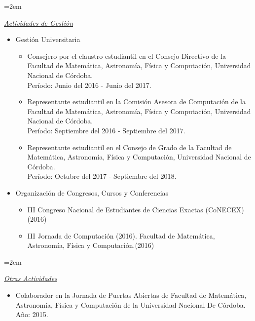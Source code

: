 \documentclass[paper=a4,fontsize=11pt]{scrartcl} %
\newlength{\spacebox}
\newcommand{\PersonalEntry}[2]{
		\noindent\hangindent=2em\hangafter=0 %
		\parbox{\spacebox}{        %
		\textit{#1}}		       %
		\hspace{1.5em} #2 \par}    %
\newcommand{\SkillsEntry}[2]{      %
		\noindent\hangindent=2em\hangafter=0 %
		\parbox{\spacebox}{        %
		\textit{#1}}			   %
		\hspace{1.5em} #2 \par}    %
\begin{document}
\SkillsEntry{\underline{Actividades de Gestión}} {
\begin{itemize}

\item{Gestión Universitaria}{
\begin{itemize}

\item{Consejero por el claustro estudiantil en el Consejo Directivo de la Facultad de Matemática, Astronomía, Física y Computación, Universidad Nacional de Córdoba. \\}{Período: Junio del 2016 - Junio del 2017.}{}

\item{Representante estudiantil en la Comisión Asesora de Computación de la Facultad de Matemática, Astronomía, Física y Computación, Universidad Nacional de Córdoba. \\}{Período: Septiembre del 2016 - Septiembre del 2017.}{}

\item{Representante estudiantil en el Consejo de Grado de la Facultad de Matemática, Astronomía, Física y Computación, Universidad Nacional de Córdoba. \\}{Período: Octubre del 2017 - Septiembre del 2018.}{}

\end{itemize}
}

\item{Organización de Congresos, Cursos y Conferencias}{
\begin{itemize}

\item{III Congreso Nacional de Estudiantes de Ciencias Exactas (CoNECEX)}{ (2016)}

\item{III Jornada de Computación (2016). Facultad de Matemática, Astronomía, Física y Computación.}{(2016)}

\end{itemize}
}

\end{itemize}
}

\SkillsEntry{\underline{Otras Actividades}}
{
\begin{itemize}

\item{Colaborador en la Jornada de Puertas Abiertas de Facultad de Matemática, Astronomía, Física y Computación de la Universidad Nacional De Córdoba.}{\\Año: 2015.}{}


\end{itemize}
}
\end{document}

